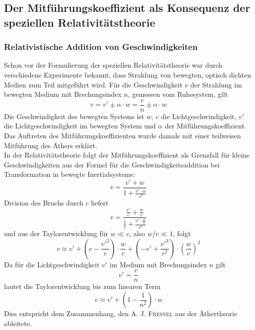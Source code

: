 \subsection{Der Mitführungskoeffizient als Konsequenz der speziellen Relativitätstheorie}

\subsubsection*{Relativistische Addition von Geschwindigkeiten}
Schon vor der Formulierung der speziellen Relativitätstheorie war durch verschiedene Experimente bekannt,
dass Strahlung von bewegten, optisch dichten Medien zum Teil mitgeführt wird.
Für die Geschwindigkeit $v$ der Strahlung im bewegten Medium mit Brechungsindex $n$, gemessen vom Ruhesystem,
gilt
\begin{equation}
\label{}
v = v' \pm \alpha \cdot w = \frac{c}{n} \pm \alpha \cdot w
\end{equation}
Die Geschwindigkeit des bewegten Systems ist $w$, $c$ die Lichtgeschwindigkeit,
$v'$ die Lichtgeschwindigkeit im bewegten System und
$\alpha$ der Mitführungskoeffizient.
Das Auftreten des Mitführungskoeffizienten wurde damals mit einer teilweisen Mitführung des Äthers erklärt.\\
In der Relativitätstheorie folgt der Mitführungskoeffizient als Grenzfall für kleine Geschwindigkeiten
aus der Formel für die Geschwindigkeitsaddition bei Transformation in bewegte Inertialsysteme:
\begin{equation}
\label{}
v=\frac{v'+w}{1+\frac{v' \cdot w}{c^2}}
\end{equation}
Division des Bruchs durch $c$ liefert
\begin{equation}
\label{}
v=\frac{\frac{v'}{c}+\frac{w}{c}}{\frac{1}{c}+\frac{v' \cdot \frac{w}{c}}{c^2}}
\end{equation} 
und aus der Taylorentwicklung für $w \ll c$, also $w/c \ll 1$, folgt
\begin{equation}
\label{}
v \approx v' + (c-\frac{v'^2}{c})\cdot \frac{w}{c}+ (-v'+\frac{v'^3}{c^2})\cdot \left(\frac{w}{c}\right)^2
\end{equation}
Da für die Lichtgeschwindigkeit $v'$ im Medium mit Brechungsindex $n$ gilt
\begin{equation}
\label{}
v'=\frac{c}{n}
\end{equation}
lautet die Taylorentwicklung bis zum linearen Term
\begin{equation}
\label{}
v \approx v' + (1-\frac{1}{n^2})\cdot w
\end{equation}
Dies entspricht dem Zusammenhang, den A. J. \textsc{Fresnel} aus der Äthertheorie ableitete.

